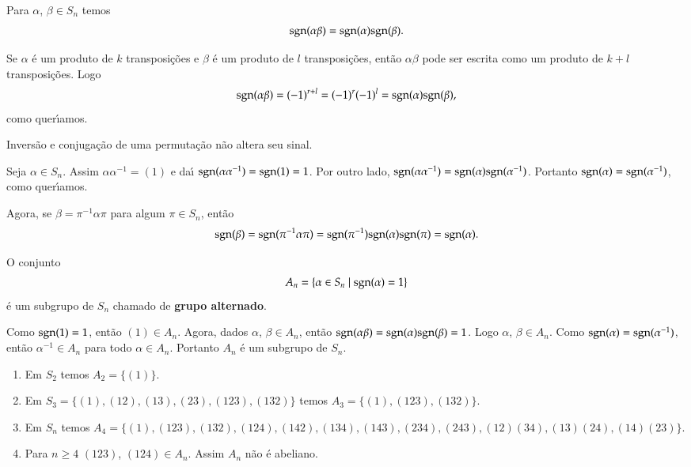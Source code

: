 \begin{proposicao}
	Para $\alpha$, $\beta \in S_n$ temos
	\[
		{\rm sgn}(\alpha\beta) = {\rm sgn}(\alpha){\rm sgn}(\beta).
	\]
\end{proposicao}
\begin{prova}
	Se $\alpha$ \'e um produto de $k$ transposi\c{c}\~oes e $\beta$ \'e um produto de $l$ transposi\c{c}\~oes, ent\~ao $\alpha\beta$ pode ser escrita como um produto de $k + l$ transposi\c{c}\~oes. Logo
	\[
		{\rm sgn}(\alpha\beta) = (-1)^{r + l} = (-1)^r(-1)^l = {\rm sgn}(\alpha){\rm sgn}(\beta),
	\]
	como quer{\'\i}amos.
\end{prova}

\begin{corolario}
	Invers\~ao e conjuga\c{c}\~ao de uma permuta\c{c}\~ao n\~ao altera seu sinal.
\end{corolario}
\begin{prova}
	Seja $\alpha \in S_n$. Assim $\alpha\alpha^{-1} = (1)$ e da{\'\i} ${\rm sgn}(\alpha\alpha^{-1}) = {\rm sgn}(1) = 1$. Por outro lado, ${\rm sgn}(\alpha\alpha^{-1}) = {\rm sgn}(\alpha){\rm sgn}(\alpha^{-1})$. Portanto ${\rm sgn}(\alpha) = {\rm sgn}(\alpha^{-1})$, como quer{\'\i}amos.
	
	Agora, se $\beta = \pi^{-1}\alpha\pi$ para algum $\pi \in S_n$, ent\~ao
	\[
		{\rm sgn}(\beta) = {\rm sgn}(\pi^{-1}\alpha\pi) = {\rm sgn}(\pi^{-1}){\rm sgn}(\alpha){\rm sgn}(\pi) = {\rm sgn}(\alpha).
	\]
\end{prova}

\begin{corolario}
	O conjunto
	\[
		A_n = \{\alpha \in S_n \mid {\rm sgn}(\alpha) = 1\}
	\]
	\'e um subgrupo de $S_n$ chamado de \textbf{grupo alternado}.
\end{corolario}
\begin{prova}
	Como ${\rm sgn}(1) = 1$, ent\~ao $(1) \in A_n$. Agora, dados $\alpha$, $\beta \in A_n$, ent\~ao ${\rm sgn}(\alpha\beta) = {\rm sgn}(\alpha){\rm sgn}(\beta) = 1$. Logo $\alpha$, $\beta \in A_n$. Como ${\rm sgn}(\alpha) = {\rm sgn}(\alpha^{-1})$, ent\~ao $\alpha^{-1} \in A_n$ para todo $\alpha \in A_n$. Portanto $A_n$ \'e um subgrupo de $S_n$.
\end{prova}

\begin{exemplos}
	\begin{enumerate}
		\item Em $S_2$ temos $A_2 = \{(1)\}$.

		\item Em $S_3 = \{(1), (12), (13), (23), (123), (132)\}$ temos $A_3 = \{(1), (123), (132)\}$.

		\item Em $S_n$ temos $A_4 = \{(1), (123), (132), (124), (142), (134), (143), (234), (243), (12)(34), (13)(24), (14)(23)\}$.

		\item Para $n \ge 4$ $(123)$, $(124) \in A_n$. Assim $A_n$ n\~ao \'e abeliano.
	\end{enumerate}
\end{exemplos}

